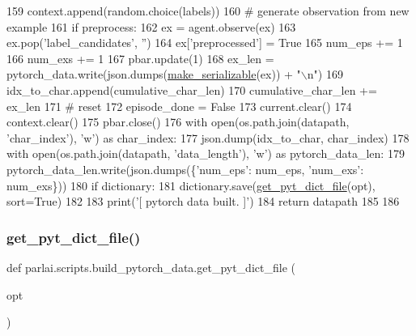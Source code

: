 \begin{DoxyCode}
159                     context.append(random.choice(labels))
160                 \textcolor{comment}{# generate observation from new example}
161                 \textcolor{keywordflow}{if} preprocess:
162                     ex = agent.observe(ex)
163                     ex.pop(\textcolor{stringliteral}{'label\_candidates'}, \textcolor{stringliteral}{''})
164                     ex[\textcolor{stringliteral}{'preprocessed'}] = \textcolor{keyword}{True}
165                 num\_eps += 1
166                 num\_exs += 1
167                 pbar.update(1)
168                 ex\_len = pytorch\_data.write(json.dumps(\hyperlink{namespaceparlai_1_1scripts_1_1build__pytorch__data_a1c8f4633b7dc8e990a3e1f6c3e92bd3f}{make\_serializable}(ex)) + \textcolor{stringliteral}{"\(\backslash\)n"})
169                 idx\_to\_char.append(cumulative\_char\_len)
170                 cumulative\_char\_len += ex\_len
171             \textcolor{comment}{# reset}
172             episode\_done = \textcolor{keyword}{False}
173             current.clear()
174             context.clear()
175     pbar.close()
176     with open(os.path.join(datapath, \textcolor{stringliteral}{'char\_index'}), \textcolor{stringliteral}{'w'}) \textcolor{keyword}{as} char\_index:
177         json.dump(idx\_to\_char, char\_index)
178     with open(os.path.join(datapath, \textcolor{stringliteral}{'data\_length'}), \textcolor{stringliteral}{'w'}) \textcolor{keyword}{as} pytorch\_data\_len:
179         pytorch\_data\_len.write(json.dumps(\{\textcolor{stringliteral}{'num\_eps'}: num\_eps, \textcolor{stringliteral}{'num\_exs'}: num\_exs\}))
180     \textcolor{keywordflow}{if} dictionary:
181         dictionary.save(\hyperlink{namespaceparlai_1_1scripts_1_1build__pytorch__data_a6ec85a5842150af78f5178d75075b0cc}{get\_pyt\_dict\_file}(opt), sort=\textcolor{keyword}{True})
182 
183     print(\textcolor{stringliteral}{'[ pytorch data built. ]'})
184     \textcolor{keywordflow}{return} datapath
185 
186 
\end{DoxyCode}
\mbox{\label{namespaceparlai_1_1scripts_1_1build__pytorch__data_a6ec85a5842150af78f5178d75075b0cc}} 
\subsubsection{\texorpdfstring{get\+\_\+pyt\+\_\+dict\+\_\+file()}{get\_pyt\_dict\_file()}}
{\footnotesize\ttfamily def parlai.\+scripts.\+build\+\_\+pytorch\+\_\+data.\+get\+\_\+pyt\+\_\+dict\+\_\+file (\begin{DoxyParamCaption}\item[{}]{opt }\end{DoxyParamCaption})}



